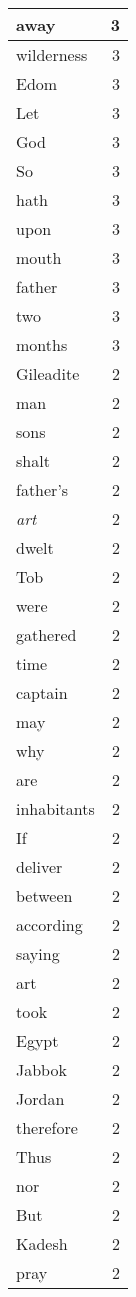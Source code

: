 \begin{center}
\begin{longtable}{l|r}
away & 3\\ \hline 
wilderness & 3\\ \hline 
Edom & 3\\ \hline 
Let & 3\\ \hline 
God & 3\\ \hline 
So & 3\\ \hline 
hath & 3\\ \hline 
upon & 3\\ \hline 
mouth & 3\\ \hline 
father & 3\\ \hline 
two & 3\\ \hline 
months & 3\\ \hline 
Gileadite & 2\\ \hline 
man & 2\\ \hline 
sons & 2\\ \hline 
shalt & 2\\ \hline 
father's & 2\\ \hline 
\emph{art} & 2\\ \hline 
dwelt & 2\\ \hline 
Tob & 2\\ \hline 
were & 2\\ \hline 
gathered & 2\\ \hline 
time & 2\\ \hline 
captain & 2\\ \hline 
may & 2\\ \hline 
why & 2\\ \hline 
are & 2\\ \hline 
inhabitants & 2\\ \hline 
If & 2\\ \hline 
deliver & 2\\ \hline 
between & 2\\ \hline 
according & 2\\ \hline 
saying & 2\\ \hline 
art & 2\\ \hline 
took & 2\\ \hline 
Egypt & 2\\ \hline 
Jabbok & 2\\ \hline 
Jordan & 2\\ \hline 
therefore & 2\\ \hline 
Thus & 2\\ \hline 
nor & 2\\ \hline 
But & 2\\ \hline 
Kadesh & 2\\ \hline 
pray & 2\\ \hline 

\end{longtable}
\end{center}
